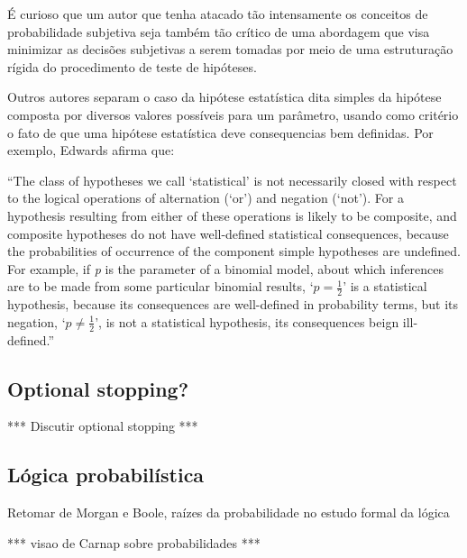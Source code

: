 \documentclass[12pt,a4paper]{article}
\begin{document}
É curioso que um autor que tenha atacado tão intensamente os conceitos de probabilidade subjetiva seja também tão crítico de 
uma abordagem que visa minimizar as decisões subjetivas a serem tomadas por meio de uma estruturação rígida do procedimento
de teste de hipóteses. 

Outros autores separam o caso da hipótese estatística dita simples da hipótese composta por diversos valores possíveis para um
parâmetro, usando como critério o fato de que uma hipótese estatística deve consequencias bem definidas.
Por exemplo, Edwards afirma que:

``The class of hypotheses we call `statistical' is not necessarily closed with respect to the logical operations of
alternation (`or') and negation (`not'). For a hypothesis resulting from either of these operations is likely to be composite,
and composite hypotheses do not have well-defined statistical consequences, because the probabilities of occurrence of the
component simple hypotheses are undefined. For example, if {\em p} is the parameter of a binomial model, about which inferences
are to be made from some particular binomial results, `$p = \frac{1}{2}$' is a statistical hypothesis, because its 
consequences are well-defined in probability terms, but its negation, `$p \neq \frac{1}{2}$', is not a statistical hypothesis,
its consequences beign ill-defined.''\cite{Edwards72}

\subsection {Optional stopping?}

*** Discutir optional stopping ***
\subsection{Lógica probabilística}

Retomar de Morgan e Boole, raízes da probabilidade no estudo formal da lógica

*** visao de Carnap sobre probabilidades ***
\end{document}
